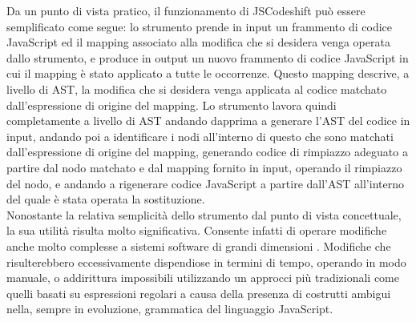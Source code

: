 Da un punto di vista pratico, il funzionamento di JSCodeshift può essere
semplificato come segue: lo strumento prende in input un frammento di codice
JavaScript ed il mapping associato alla modifica che si desidera venga operata
dallo strumento, e produce in output un nuovo frammento di codice JavaScript in
cui il mapping è stato applicato a tutte le occorrenze. Questo mapping
descrive, a livello di AST, la modifica che si desidera venga applicata al
codice matchato dall’espressione di origine del mapping. Lo strumento lavora
quindi completamente a livello di AST andando dapprima a generare l’AST del
codice in input, andando poi a identificare i nodi all’interno di questo che
sono matchati dall’espressione di origine del mapping, generando codice di
rimpiazzo adeguato a partire dal nodo matchato e dal mapping fornito in input,
operando il rimpiazzo del nodo, e andando a rigenerare codice JavaScript a
partire dall’AST all’interno del quale è stata operata la sostituzione.\\

Nonostante la relativa semplicità dello strumento dal punto di vista
concettuale, la sua utilità risulta molto significativa. Consente infatti di
operare modifiche anche molto complesse a sistemi software di grandi dimensioni
\cite{jsconf2016}. Modifiche che risulterebbero eccessivamente dispendiose in
termini di tempo, operando in modo manuale, o addirittura impossibili
utilizzando un approcci più tradizionali come quelli basati su espressioni
regolari a causa della presenza di costrutti ambigui nella, sempre in
evoluzione, grammatica del linguaggio JavaScript.\\


